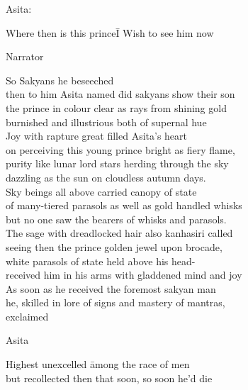 \begin{MyDescription}[]{Asita:}
\end{MyDescription}   
\begin{tabbing}
Where then is this prince\= I Wish to see him now\\
\end{tabbing}

\begin{MyDescription}[]{Narrator}
\end{MyDescription}   
\begin{tabbing}
So Sakyans he beseeched\\
then to him Asita named \hspace{1.5cm} \= did sakyans show their son\\
the prince in colour clear \> as rays from shining gold\\
burnished and illustrious both \> of supernal hue\\
Joy with rapture great \> filled Asita's heart\\
on perceiving this young prince \> bright as fiery flame,\\
purity like lunar lord \> stars herding through the sky\\
dazzling as the sun \> on cloudless autumn days.\\
Sky beings all above \> carried canopy of state\\
of many-tiered parasols \> as well as gold handled whisks\\
but no one saw the bearers \> of whisks and parasols.\\
The sage with dreadlocked hair \> also kanhasiri called\\
seeing then the prince \> golden jewel upon brocade,\\
white parasols of state \> held above his head-\\
received him in his arms \> with gladdened mind and joy\\
As soon as he received \> the foremost sakyan man\\
he, skilled in lore of signs \> and mastery of mantras,\\
exclaimed\\
\end{tabbing}

\begin{MyDescription}[]{Asita}
\end{MyDescription}   
\begin{tabbing}
Highest unexcelled \hspace{1cm}\= among the race of men\\
but recollected then \> that soon, so soon he'd die\\
\end{tabbing}

